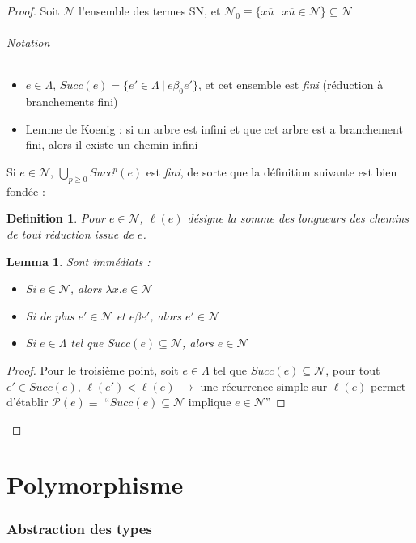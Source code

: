 \documentclass{article}
\newtheorem{lemma}{Lemma}
\newtheorem{defi}{Definition}
\newcommand\lterm[2]{\lambda #1. #2}
\begin{document}
\begin{proof}
Soit $\mathcal{N}$ l'ensemble des termes SN, et $\mathcal{N}_0 \equiv \{  x\overline{u} \:|\: x\overline{u} \in \mathcal{N}\} \subseteq \mathcal{N}$
\paragraph{Notation}
\begin{itemize}
\item $e\in \Lambda$, $Succ(e)=\{e'\in \Lambda \:|\: e\beta_0 e' \}$, et cet ensemble est \emph{fini} (réduction à branchements fini)
\item Lemme de Koenig : si un arbre est infini et que cet arbre est a branchement fini, alors il existe un chemin infini
\end{itemize}

Si $e\in \mathcal{N}$, $\bigcup_{p\geq 0} Succ^p (e)$ est \emph{fini}, de sorte que la définition suivante est bien fondée :

\begin{defi}
Pour $e\in \mathcal{N}$, $\ell(e)$ désigne la somme des longueurs des chemins de tout réduction issue de $e$.
\end{defi}

\begin{lemma}
Sont immédiats :
\begin{itemize}
\item Si $e\in \mathcal{N}$, alors $\lterm{x}{e} \in \mathcal{N}$
\item Si de plus $e' \in \mathcal{N}$ et $e \beta e'$, alors $e' \in \mathcal{N}$
\item Si $e \in \Lambda$ tel que $Succ(e)\subseteq \mathcal{N}$, alors $e\in \mathcal{N}$
\end{itemize}
\end{lemma}
\begin{proof}
Pour le troisième point, soit $e\in \Lambda$ tel que $Succ(e)\subseteq \mathcal{N}$, pour tout $e' \in Succ(e)$, $\ell (e') < \ell(e)$ $\to$ une récurrence simple sur $\ell(e)$ permet d'établir $\mathcal{P}(e) \equiv$ ``$Succ(e) \subseteq \mathcal{N}$ implique $e\in \mathcal{N}$''
\end{proof}

\end{proof}




\part{Polymorphisme}
\section{Abstraction des types}
\end{document}
